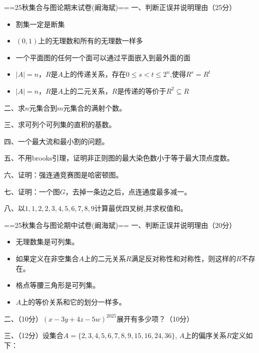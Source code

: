 
==25秋集合与图论期末试卷(阚海斌)==
一、判断正误并说明理由（25分）

\begin{itemize}
    \item 割集一定是断集
    \item $(0,1)$上的无理数和所有的无理数一样多
    \item 一个平面图的任何一个面可以通过平面嵌入到最外面的面
    \item $|A|=n$，$R$是$A$上的传递关系，存在$0 \le s < t \le 2^n$,使得$R^s=R^t$
    \item $|A|=n$，$R$是$A$上的二元关系，$R$是传递的等价于$R^2\subseteq R$
\end{itemize}

二、求$n$元集合到$m$元集合的满射个数。

三、求可列个可列集的直积的基数。

四、一个最大流和最小割的问题。

五、不用brooks引理，证明非正则图的最大染色数小于等于最大顶点度数。

六、证明：强连通竞赛图是哈密顿图。

七、证明：一个图$G$，去掉一条边之后，点连通度最多减一。

八、以$1,1,2,2,3,4,5,6,7,8,9$计算最优四叉树,并求权值和。

==25秋集合与图论期中试卷(阚海斌)==
一、判断正误并说明理由（20分）

\begin{itemize}
    \item 无理数集是可列集。
    \item 如果定义在非空集合$A$上的二元关系$R$满足反对称性和对称性，则这样的$R$不存在。
    \item 格点等腰三角形是可列集。
    \item $A$上的等价关系和它的划分一样多。
\end{itemize}

二、（10分）$(x-3y+4z-5w)^{2025}$展开有多少项？（10分）

三、（12分）设集合$A=\{2,3,4,5,6,7,8,9,15,16,24,36\}$, $A$上的偏序关系$R$定义如下：

